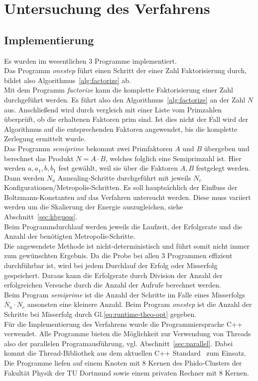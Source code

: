 \chapter{Untersuchung des Verfahrens}

\section{Implementierung}
Es wurden im wesentlichen $3$ Programme implementiert.  \\
Das Programm \textit{onestep} führt einen Schritt der einer Zahl Faktorisierung durch, bildet also Algorithmus~\ref{alg:factorize} ab. \\
Mit dem Programm \textit{factorize} kann die komplette Faktorisierung einer Zahl durchgeführt werden. Es führt also den Algorithmus~\ref{alg:factorize} an der Zahl $N$ aus. Anschließend wird durch vergleich mit einer Liste vom Primzahlen überprüft, ob die erhaltenen Faktoren prim sind. Ist dies nicht der Fall wird der Algorithmus auf die entsprechenden Faktoren angewendet, bis die komplette Zerlegung ermittelt wurde. \\
Das Programm \textit{semiprime} bekommt zwei Primfaktoren $A$ und $B$ übergeben und berechnet das Produkt $N=A\cdot B$, welches folglich eine Semiprimzahl ist. Hier werden $a, a_1, b, b_1$ fest gewählt, weil sie über die Faktoren $A,B$ festgelegt werden. Dann werden $N_a$ Annealing-Schritte durchgeführt mit jeweils $N_c$ Konfigurationen/Metropolis-Schritten. Es soll hauptsächlich der Einfluss der Boltzmann-Konstanten auf das Verfahren untersucht werden. Diese muss variiert werden um die Skalierung der Energie auszugleichen, siehe Abschnitt~\ref{sec:kbguess}. \\
Beim Programmdurchlauf werden jeweils die Laufzeit, der Erfolgsrate und die Anzahl der benötigten Metropolis-Schritte. \\
Die angewendete Methode ist nicht-deterministisch und führt somit nicht immer zum gewünschten Ergebnis. Da die Probe bei allen $3$ Programmen effizient durchführbar ist, wird bei jedem Durchlauf der Erfolg oder Misserfolg gespeichert. Daraus kann die Erfolgsrate durch Division der Anzahl der erfolgreichen Versuche durch die Anzahl der Aufrufe berechnet werden. \\
Beim Program \textit{semiprime} ist die Anzahl der Schritte im Falle eines Misserfolgs $N_a\cdot N_c$ ansonsten eine kleinere Anzahl. Beim Program \textit{onestep} ist die Anzahl der Schritte bei Misserfolg durch Gl.\eqref{eq:runtime-theo-opt} gegeben.\\
Für die Implementierung des Verfahrens wurde die Programmiersprache C++ verwendet. Alle Programme bieten die Möglichkeit zur Verwendung von Threads also der parallelen Programausführung, vgl. Abschnitt~\ref{sec:parallel}. Dabei kommt die Thread-Bibliothek aus dem aktuellen C++ Standard~\parencite{cppthreads} zum Einsatz. \\
Die Programme liefen auf einem Knoten mit $8$ Kernen des Phido-Clusters der Fakultät Physik der TU Dortmund sowie einem privaten Rechner mit $8$ Kernen.

